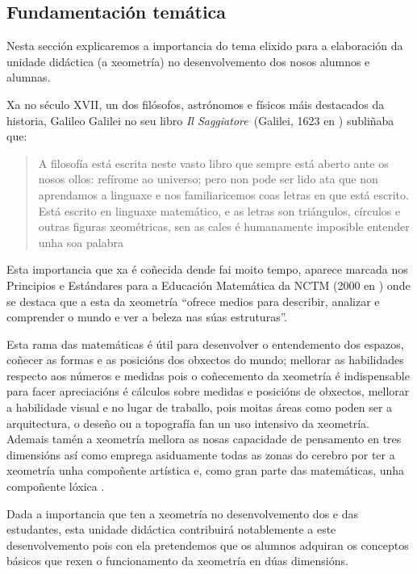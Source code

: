 \subsection{Fundamentación temática}

Nesta sección explicaremos a importancia do tema elixido para a elaboración da unidade didáctica (a xeometría) no desenvolvemento dos nosos alumnos e alumnas.

Xa no século XVII, un dos filósofos, astrónomos e físicos máis destacados da historia, Galileo Galilei no seu libro \emph{Il Saggiatore}~(Galilei, 1623 en ) subliñaba que:
\begin{quote}
\vspace{-0.3\baselineskip}
A filosofía está escrita neste vasto libro que sempre está aberto ante os nosos ollos: refírome ao universo; pero non pode ser lido ata que non aprendamos a linguaxe e nos familiaricemos coas letras en que está escrito. Está escrito en linguaxe matemático, e as letras son triángulos, círculos e outras figuras xeométricas, sen as cales é humanamente imposible entender unha soa palabra
\vspace{-0.6\baselineskip}
\end{quote}

Esta importancia que xa é coñecida dende fai moito tempo, aparece marcada nos Principios e Estándares para a Educación Matemática da NCTM (2000 en ) onde se destaca que a esta da xeometría ``ofrece medios para describir, analizar e comprender o mundo e ver a beleza nas súas estruturas''.

Esta rama das matemáticas é útil para desenvolver o entendemento dos espazos, coñecer as formas e as posicións dos obxectos do mundo; mellorar as habilidades respecto aos números e medidas pois o coñecemento da xeometría é indispensable para facer apreciacións é cálculos sobre medidas e posicións de obxectos, mellorar a habilidade visual e no lugar de traballo, pois moitas áreas como poden ser a arquitectura, o deseño ou a topografía fan un uso intensivo da xeometría. Ademais tamén a xeometría mellora as nosas capacidade de pensamento en tres dimensións así como emprega asiduamente todas as zonas do cerebro por ter a xeometría unha compoñente artística e, como gran parte das matemáticas, unha compoñente lóxica \cite{shockingreasons}.

Dada a importancia que ten a xeometría no desenvolvemento dos e das estudantes, esta unidade didáctica contribuirá notablemente a este desenvolvemento pois con ela pretendemos que os alumnos adquiran os conceptos básicos que rexen o funcionamento da xeometría en dúas dimensións.
